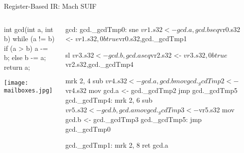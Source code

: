 \documentclass{plt}
\begin{document}
\begin{frame}[fragile=singleslide]{Register-Based IR: Mach SUIF}


  \begin{columns}
    \begin{column}{0.35\textwidth}
\begin{java}
int gcd(int a, int b) {
  while (a != b) {
    if (a > b)
      a -= b;
    else
      b -= a;
  }
  return a;
}
\end{java}

\vspace{2pc}

\texttt{[image: mailboxes.jpg]}
    \end{column}
    \begin{column}{0.65\textwidth}
\fontsize{8}{8}\selectfont
\begin{semiverbatim}
gcd:
gcd._gcdTmp0:
  sne   $vr1.s32 <- gcd.a,gcd.b
  seq   $vr0.s32 <- $vr1.s32,0
  btrue $vr0.s32,gcd._gcdTmp1  

  sl    $vr3.s32 <- gcd.b,gcd.a
  seq   $vr2.s32 <- $vr3.s32,0
  btrue $vr2.s32,gcd._gcdTmp4  

  mrk   2, 4   
  sub   $vr4.s32 <- gcd.a,gcd.b
  mov   gcd._gcdTmp2 <- $vr4.s32
  mov   gcd.a <- gcd._gcdTmp2  
  jmp   gcd._gcdTmp5
gcd._gcdTmp4:
  mrk   2, 6
  sub   $vr5.s32 <- gcd.b,gcd.a
  mov   gcd._gcdTmp3 <- $vr5.s32
  mov   gcd.b <- gcd._gcdTmp3  
gcd._gcdTmp5:
  jmp   gcd._gcdTmp0

gcd._gcdTmp1:
  mrk   2, 8
  ret   gcd.a  
\end{semiverbatim}
    \end{column}
  \end{columns}
\end{frame}
\end{document}
